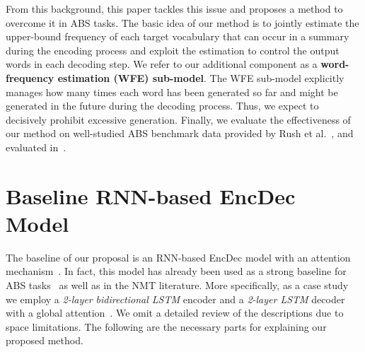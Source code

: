 \documentclass[11pt]{article}
\begin{document}
 
   From this background, this paper tackles this issue and proposes a method to overcome it in ABS tasks.
   The basic idea of our method is to jointly estimate the upper-bound frequency of each target vocabulary that can occur in a summary during the encoding process and exploit the estimation to control the output words in each decoding step.
   We refer to our additional component as a {\bf word-frequency estimation (WFE) sub-model}.
   The WFE sub-model explicitly manages how many times each word has been generated so far and might be generated in the future during the decoding process.
   Thus, we expect to decisively prohibit excessive generation.
   Finally, we evaluate the effectiveness of our method on well-studied ABS benchmark data provided by Rush et al.~, and evaluated in~\cite{chopra-auli-rush:2016:N16-1,nallapati-EtAl:2016:CoNLL,kikuchi-EtAl:2016:EMNLP2016,takase-EtAl:2016:EMNLP2016,DBLP:journals/corr/AyanaSLS16,gulcehre-EtAl:2016:P16-1}.


\section{Baseline RNN-based EncDec Model}
   The baseline of our proposal is an RNN-based EncDec model with an attention mechanism~\cite{luong-pham-manning:2015:EMNLP}.
   In fact, this model has already been used as a strong baseline for ABS tasks~\cite{chopra-auli-rush:2016:N16-1,kikuchi-EtAl:2016:EMNLP2016} as well as in the NMT literature.
   More specifically,  as a case study we employ a {\it 2-layer bidirectional LSTM} encoder and a {\it 2-layer LSTM} decoder with a global attention~\cite{DBLP:journals/corr/BahdanauCB14}.
   We omit a detailed review of the descriptions due to space limitations.
   The following are the necessary parts for explaining our proposed method.
\end{document}

